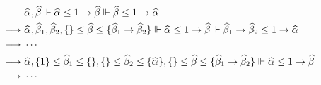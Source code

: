 \begin{gather*}
    \begin{aligned}
     & \al, \bt \Vdash \al \le 1 \to \bt \Vdash \bt \le 1 \to \al\\
\rto~& \al, \bt[1], \bt[2], \{\} \le \bt \le \{\bt[1] \to \bt[2]\}
        \Vdash \al \le 1 \to \bt \Vdash \bt[1] \to \bt[2] \le 1 \to \al\\
\rto~& \cdots\\
\rto~& \al, \{1\} \le \bt[1] \le \{\}, \{\} \le \bt[2] \le \{\al\},
        \{\} \le \bt \le \{\bt[1] \to \bt[2]\}
        \Vdash \al \le 1 \to \bt\\
\rto~& \cdots\\
    \end{aligned}
\end{gather*}

